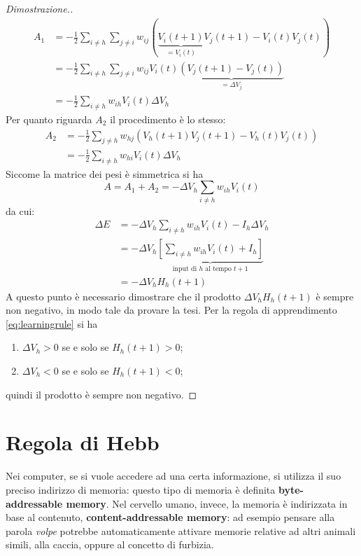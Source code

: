 \begin{proof}[Dimostrazione.]
	\begin{align*}
		A_1 &= - \frac{1}{2} \sum_{i \neq h} \sum_{j \neq i} w_{ij} (\underbrace{V_i(t + 1)}_\textrm{$=V_i(t)$} V_j(t + 1) - V_i(t) V_j(t)) \\
		&= - \frac{1}{2} \sum_{i \neq h} \sum_{j \neq i} w_{ij} V_i(t) \underbrace{(V_j(t + 1) - V_j(t))}_\textrm{$=\Delta V_j$} \\
		&= - \frac{1}{2} \sum_{i \neq h} w_{ih} V_i(t) \Delta V_h
	\end{align*}
	Per quanto riguarda $A_2$ il procedimento è lo stesso:
	\begin{align*}
		A_2 &= - \frac{1}{2} \sum_{j \neq h} w_{hj} (V_h(t + 1) V_j(t + 1) - V_h(t) V_j(t)) \\
		&= - \frac{1}{2} \sum_{i \neq h} w_{hi} V_i(t) \Delta V_h
	\end{align*}
	Siccome la matrice dei pesi è simmetrica si ha
	\begin{displaymath}
		A = A_1 + A_2 = - \Delta V_h \sum_{i \neq h} w_{ih} V_i(t)
	\end{displaymath}
	da cui:
	\begin{align*}
		\Delta E &= - \Delta V_h \sum_{i \neq h} w_{ih} V_i(t)  - I_h \Delta V_h \\
		&= - \Delta V_h \underbrace{\left[\sum_{i \neq h} w_{ih} V_i(t) + I_h \right]}_\textrm{input di $h$ al tempo $t + 1$} \\
		&= - \Delta V_h H_h(t + 1)
	\end{align*}
	A questo punto è necessario dimostrare che il prodotto $\Delta V_h H_h(t + 1)$ è sempre non negativo, in modo tale da provare la tesi. Per la regola di apprendimento \eqref{eq:learningrule} si ha
	\begin{enumerate}
		\item $\Delta V_h > 0$ se e solo se $H_h(t + 1) > 0$;
		\item $\Delta V_h < 0$ se e solo se $H_h(t + 1) < 0$;
	\end{enumerate}
	quindi il prodotto è sempre non negativo.
\end{proof}

\section{Regola di Hebb}

Nei computer, se si vuole accedere ad una certa informazione, si utilizza il suo preciso indirizzo di memoria: questo tipo di memoria è definita \textbf{byte-addressable memory}. Nel cervello umano, invece, la memoria è indirizzata in base al contenuto, \textbf{content-addressable memory}: ad esempio pensare alla parola \emph{volpe} potrebbe automaticamente attivare memorie relative ad altri animali simili, alla caccia, oppure al concetto di furbizia.

